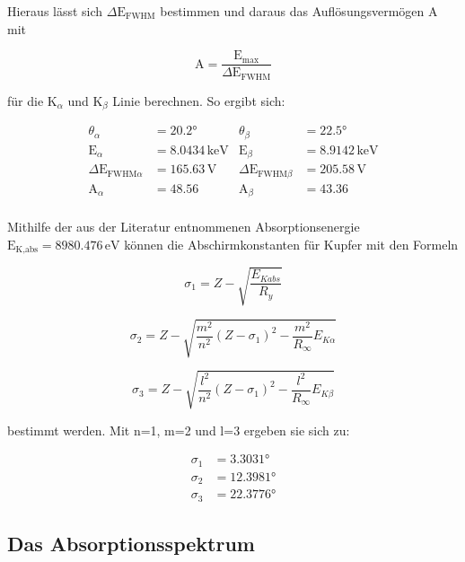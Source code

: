 \noindent
Hieraus lässt sich $\Delta\text{E}_{\text{FWHM}}$ bestimmen und daraus das Auflösungsvermögen A mit 

\begin{equation*}
\text{A}=\frac{\text{E}_{\text{max}}}{\Delta\text{E}_{\text{FWHM}}}
\end{equation*}

\noindent
für die $\text{K}_\alpha$ und $\text{K}_\beta$ Linie berechnen.
So ergibt sich:

\begin{align*}
\theta_\alpha&=20.2° & \theta_\beta&=22.5° \\
\text{E}_\alpha&=8.0434 \, \mathrm{keV}   &\text{E}_\beta&=8.9142 \, \mathrm{keV} \\
\Delta\text{E}_{\text{FWHM}\alpha}&=165.63 \, \mathrm{V}   &\Delta\text{E}_{\text{FWHM}\beta}&=205.58 \, \mathrm{V} \\
\text{A}_\alpha&=48.56  &\text{A}_\beta&=43.36 \\
\end{align*}

\noindent
Mithilfe der aus der Literatur entnommenen Absorptionsenergie $\text{E}_\text{K,abs} = 8980.476 \, \mathrm{eV}$ 
können die Abschirmkonstanten für Kupfer mit den Formeln 

\begin{equation*}
\sigma_1=Z-\sqrt{\frac{E_{Kabs}}{R_y}}
\end{equation*}

\begin{equation*}
\sigma_2=Z-\sqrt{ \frac{m^2}{n^2}(Z-\sigma_1)^2 - \frac{m^2}{R_\infty} E_{K\alpha}}
\end{equation*}

\begin{equation*}
    \sigma_3=Z-\sqrt{ \frac{l^2}{n^2}(Z-\sigma_1)^2 - \frac{l^2}{R_\infty} E_{K\beta}}
\end{equation*}
    


\noindent
bestimmt werden. Mit n=1, m=2 und l=3 ergeben sie sich zu:

\begin{align*}
    \sigma_1 &= 3.3031° \\
    \sigma_2 &= 12.3981°\\
    \sigma_3 &= 22.3776°
\end{align*}

\subsection{Das Absorptionsspektrum}

